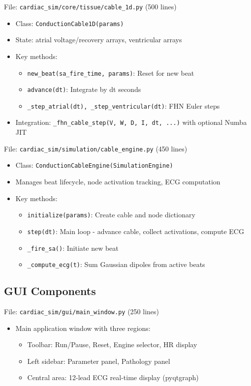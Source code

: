 \documentclass[12pt,a4paper]{article}
\begin{document}
File: \texttt{cardiac\_sim/core/tissue/cable\_1d.py} (500 lines)
\begin{itemize}
\item Class: \texttt{ConductionCable1D(params)}
\item State: atrial voltage/recovery arrays, ventricular arrays
\item Key methods:
\begin{itemize}
\item \texttt{new\_beat(sa\_fire\_time, params)}: Reset for new beat
\item \texttt{advance(dt)}: Integrate by dt seconds
\item \texttt{\_step\_atrial(dt), \_step\_ventricular(dt)}: FHN Euler steps
\end{itemize}
\item Integration: \texttt{\_fhn\_cable\_step(V, W, D, I, dt, ...)} with optional Numba JIT
\end{itemize}

File: \texttt{cardiac\_sim/simulation/cable\_engine.py} (450 lines)
\begin{itemize}
\item Class: \texttt{ConductionCableEngine(SimulationEngine)}
\item Manages beat lifecycle, node activation tracking, ECG computation
\item Key methods:
\begin{itemize}
\item \texttt{initialize(params)}: Create cable and node dictionary
\item \texttt{step(dt)}: Main loop - advance cable, collect activations, compute ECG
\item \texttt{\_fire\_sa()}: Initiate new beat
\item \texttt{\_compute\_ecg(t)}: Sum Gaussian dipoles from active beats
\end{itemize}
\end{itemize}

\subsection*{GUI Components}

File: \texttt{cardiac\_sim/gui/main\_window.py} (250 lines)
\begin{itemize}
\item Main application window with three regions:
\begin{itemize}
\item Toolbar: Run/Pause, Reset, Engine selector, HR display
\item Left sidebar: Parameter panel, Pathology panel
\item Central area: 12-lead ECG real-time display (pyqtgraph)
\end{itemize}
\end{itemize}
\end{document}
